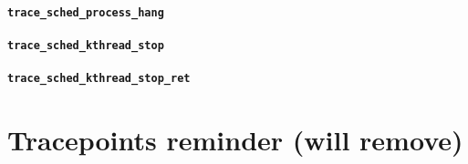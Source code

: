 \paragraph{\texttt{trace\_sched\_process\_hang}}
\paragraph{\texttt{trace\_sched\_kthread\_stop}}
\paragraph{\texttt{trace\_sched\_kthread\_stop\_ret}}

\section{Tracepoints reminder (will remove)} 

